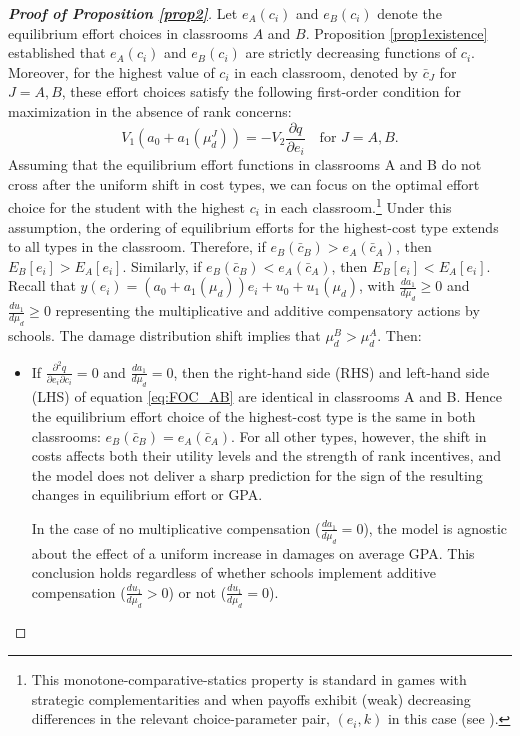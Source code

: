 \begin{proof}[{\bf Proof of Proposition \ref{prop2}}]
Let \( e_A(c_i) \) and \( e_B(c_i) \) denote the equilibrium effort choices in classrooms \( A \) and \( B \). Proposition \ref{prop1existence} established that \( e_A(c_i) \) and \( e_B(c_i) \) are strictly decreasing functions of \( c_i \). Moreover, for the highest value of \( c_i \) in each classroom, denoted by \( \bar{c}_J \) for \( J = A, B \), these effort choices satisfy the following first-order condition for maximization in the absence of rank concerns:
\begin{equation}\label{eq:FOC_AB}
    V_1 (a_0+a_1(\mu_d^J)) = -V_2 \frac{\partial q}{\partial e_i} \quad \text{for } J = A, B.
\end{equation}
Assuming that the equilibrium effort functions in classrooms A and B do not cross after the uniform shift in cost types, we can focus on the optimal effort choice for the student with the highest \( c_i \) in each classroom.\footnote{This monotone-comparative-statics property is standard in games with strategic complementarities and when payoffs exhibit (weak) decreasing differences in the relevant choice-parameter pair, $(e_i,k)$ in this case (see \cite{milgrom1994monotone}).} Under this assumption, the ordering of equilibrium efforts for the highest-cost type extends to all types in the classroom. Therefore, if \( e_B(\bar{c}_B) > e_A(\bar{c}_A) \), then \( E_B[e_i] > E_A[e_i] \). Similarly, if \( e_B(\bar{c}_B) < e_A(\bar{c}_A) \), then \( E_B[e_i] < E_A[e_i] \). Recall that $y(e_i)=(a_0 + a_1(\mu_d))e_i+u_0+u_1(\mu_d)$, with $\frac{d a_1}{d \mu_d}\geq 0$ and $\frac{d u_1}{d \mu_d}\geq 0$ representing the multiplicative and additive compensatory actions by schools. The damage distribution shift implies that $\mu_d^B>\mu^A_d$. Then:
\begin{itemize}
\item If $\frac{\partial^2 q}{\partial e_i \partial c_i}=0$ and $\frac{d a_1}{d \mu_d}=0$, then the right-hand side (RHS) and left-hand side (LHS) of equation \eqref{eq:FOC_AB} are identical in classrooms A and B. Hence the equilibrium effort choice of the highest-cost type is the same in both classrooms: $e_B(\bar c_B)=e_A(\bar c_A)$. For all other types, however, the shift in costs affects both their utility levels and the strength of rank incentives, and the model does not deliver a sharp prediction for the sign of the resulting changes in equilibrium effort or GPA.\par 

\noindent In the case of no multiplicative compensation ($\frac{d a_1}{d \mu_d}=0$), the model is agnostic about the effect of a uniform increase in damages on average GPA. This conclusion holds regardless of whether schools implement additive compensation ($\frac{d u_1}{d \mu_d}>0$) or not ($\frac{d u_1}{d \mu_d}=0$). 


\end{itemize}
\end{proof}
